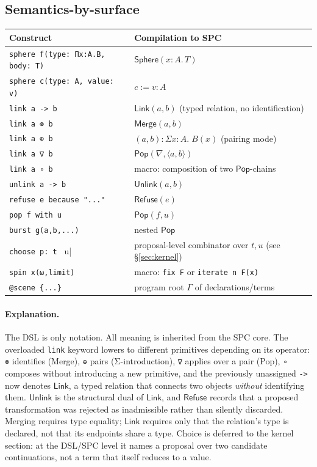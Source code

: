 \documentclass[12pt]{article}
\newcommand{\Sphere}{\mathsf{Sphere}}
\newcommand{\Pop}{\mathsf{Pop}}
\newcommand{\Merge}{\mathsf{Merge}}
\newcommand{\Ctx}{\Gamma}
\newcommand{\SigT}[3]{\Sigma #1 : #2.\; #3}
\newcommand{\Pair}[2]{\langle #1, #2 \rangle}
\theoremstyle{definition}
\newcommand{\LinkOp}{\mathsf{Link}}
\newcommand{\UnlinkOp}{\mathsf{Unlink}}
\newcommand{\RefuseOp}{\mathsf{Refuse}}
\begin{document}
\subsection{Semantics-by-surface}
\begin{center}
\begin{tabular}{ll}
\textsf{Construct} & \textsf{Compilation to SPC}\\\hline
\verb|sphere f(type: Πx:A.B, body: T)| & $\Sphere(x\!:\!A.\,T)$\\
\verb|sphere c(type: A, value: v)| & $c := v : A$\\
\verb|link a -> b|             & $\LinkOp(a,b)$ (typed relation, no identification)\\
\verb|link a ⊗ b| & $\Merge(a,b)$\\
\verb|link a ⊕ b| & $(a,b) : \SigT{x}{A}{B(x)}$ (pairing mode)\\
\verb|link a ∇ b| & $\Pop(\nabla, \Pair{a}{b})$\\
\verb|link a ∘ b|             & macro: composition of two $\Pop$-chains\\
\verb|unlink a -> b|          & $\UnlinkOp(a,b)$\\
\verb|refuse e because "..."| & $\RefuseOp(e)$\\
\verb|pop f with u| & $\Pop(f,u)$\\
\verb|burst g(a,b,...)| & nested $\Pop$\\
\verb|choose p: t | u| & proposal-level combinator over $t,u$ (see \S\ref{sec:kernel})\\
\verb|spin x(ω,limit)| & macro: \verb|fix F| or \verb|iterate n F(x)|\\
\verb|@scene {...}| & program root $\Ctx$ of declarations/terms\\
\end{tabular}
\end{center}

\paragraph{Explanation.}
The DSL is only notation.
All meaning is inherited from the SPC core.
The overloaded \verb|link| keyword lowers to different primitives depending on its operator: \verb|⊗| identifies (Merge), \verb|⊕| pairs (Σ-introduction), \verb|∇| applies over a pair (Pop), \verb|∘| composes without introducing a new primitive, and the previously unassigned \verb|->| now denotes $\LinkOp$, a typed relation that connects two objects \emph{without} identifying them. $\UnlinkOp$ is the structural dual of $\LinkOp$, and $\RefuseOp$ records that a proposed transformation was rejected as inadmissible rather than silently discarded. Merging requires type equality; $\LinkOp$ requires only that the relation's type is declared, not that its endpoints share a type. Choice is deferred to the kernel section: at the DSL/SPC level it names a proposal over two candidate continuations, not a term that itself reduces to a value.
\end{document}
